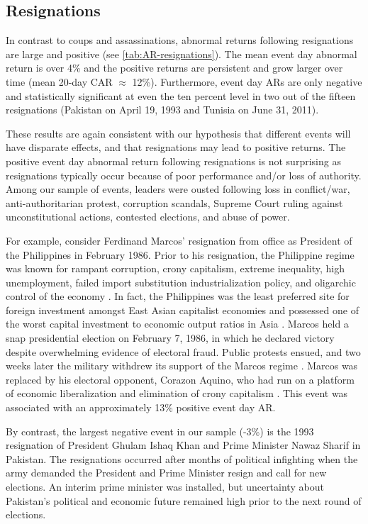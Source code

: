 \documentclass[12pt,final,fleqn]{article}
\theoremstyle{plain}
\begin{document}
\subsection{Resignations} \label{subsec: Resignations}

In contrast to coups and assassinations, abnormal returns following resignations are large and positive (see \autoref{tab:AR-resignations}). The mean event day abnormal return is over 4\% and the positive returns are persistent and grow larger over time (mean 20-day CAR $\approx$ 12\%). Furthermore, event day ARs are only negative and statistically significant at even the ten percent level in two out of the fifteen resignations (Pakistan on April 19, 1993 and Tunisia on June 31, 2011).

These results are again consistent with our hypothesis that different events will have disparate effects, and that resignations may lead to positive returns. The positive event day abnormal return following resignations is not surprising as resignations typically occur because of poor performance and/or loss of authority. Among our sample of events, leaders were ousted following loss in conflict/war, anti-authoritarian protest, corruption scandals, Supreme Court ruling against unconstitutional actions, contested elections, and abuse of power. 

For example, consider Ferdinand Marcos' resignation from office as President of the Philippines in February 1986. Prior to his resignation, the Philippine regime was known for rampant corruption, crony capitalism, extreme inequality, high unemployment, failed import substitution industrialization policy, and oligarchic control of the economy \citep{overholt1986rise, traywick2014}. In fact, the Philippines was the least preferred site for foreign investment amongst East Asian capitalist economies and possessed one of the worst capital investment to economic output ratios in Asia \citep{overholt1986rise}. Marcos held a snap presidential election on February 7, 1986, in which he declared victory despite overwhelming evidence of electoral fraud. Public protests ensued, and two weeks later the military withdrew its support of the Marcos regime \citep{lee2009armed}. Marcos was replaced by his electoral opponent, Corazon Aquino, who had run on a platform of economic liberalization and elimination of crony capitalism \citep{villegas1987philippines}. This event was associated with an approximately 13\% positive event day AR.

By contrast, the largest negative event in our sample (-3\%) is the 1993 resignation of President Ghulam Ishaq Khan and Prime Minister Nawaz Sharif in Pakistan. The resignations occurred after months of political infighting when the army demanded the President and Prime Minister resign and call for new elections. An interim prime minister was installed, but uncertainty about Pakistan's political and economic future remained high prior to the next round of elections.
\end{document}
